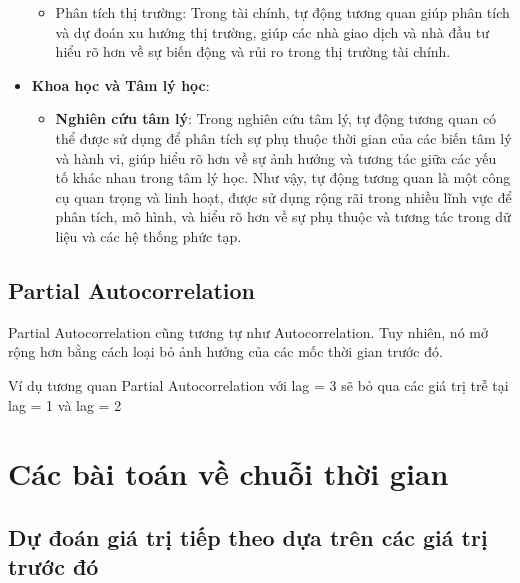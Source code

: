 \documentclass[
]{book}
\providecommand{\tightlist}{%
  \setlength{\itemsep}{0pt}\setlength{\parskip}{0pt}}
\begin{document}
\begin{itemize}
  \begin{itemize}
  \tightlist
  \item
    Phân tích thị trường: Trong tài chính, tự động tương quan giúp phân tích và dự đoán xu hướng thị trường, giúp các nhà giao dịch và nhà đầu tư hiểu rõ hơn về sự biến động và rủi ro trong thị trường tài chính.
  \end{itemize}
\item
  \textbf{Khoa học và Tâm lý học}:

  \begin{itemize}
  \tightlist
  \item
    \textbf{Nghiên cứu tâm lý}: Trong nghiên cứu tâm lý, tự động tương quan có thể được sử dụng để phân tích sự phụ thuộc thời gian của các biến tâm lý và hành vi, giúp hiểu rõ hơn về sự ảnh hưởng và tương tác giữa các yếu tố khác nhau trong tâm lý học.
    Như vậy, tự động tương quan là một công cụ quan trọng và linh hoạt, được sử dụng rộng rãi trong nhiều lĩnh vực để phân tích, mô hình, và hiểu rõ hơn về sự phụ thuộc và tương tác trong dữ liệu và các hệ thống phức tạp.
  \end{itemize}
\end{itemize}

\hypertarget{partial-autocorrelation}{%
\subsection{Partial Autocorrelation}\label{partial-autocorrelation}}

Partial Autocorrelation cũng tương tự như Autocorrelation. Tuy nhiên, nó mở rộng hơn bằng cách loại bỏ ảnh hưởng của các mốc thời gian trước đó.

Ví dụ tương quan Partial Autocorrelation với lag = 3 sẽ bỏ qua các giá trị trễ tại lag = 1 và lag = 2

\hypertarget{cuxe1c-buxe0i-touxe1n-vux1ec1-chuux1ed7i-thux1eddi-gian}{%
\section{Các bài toán về chuỗi thời gian}\label{cuxe1c-buxe0i-touxe1n-vux1ec1-chuux1ed7i-thux1eddi-gian}}

\hypertarget{dux1ef1-ux111ouxe1n-giuxe1-trux1ecb-tiux1ebfp-theo-dux1ef1a-truxean-cuxe1c-giuxe1-trux1ecb-trux1b0ux1edbc-ux111uxf3}{%
\subsection{Dự đoán giá trị tiếp theo dựa trên các giá trị trước đó}\label{dux1ef1-ux111ouxe1n-giuxe1-trux1ecb-tiux1ebfp-theo-dux1ef1a-truxean-cuxe1c-giuxe1-trux1ecb-trux1b0ux1edbc-ux111uxf3}}
\end{document}
